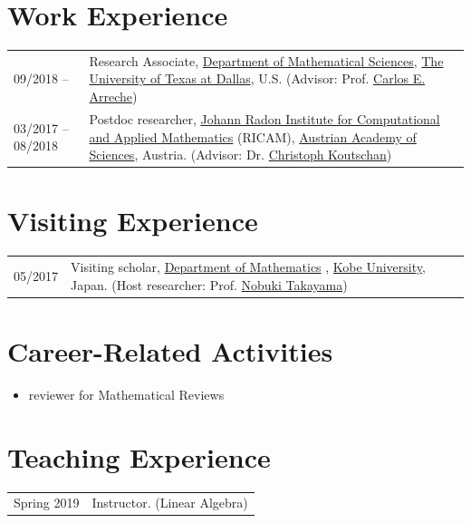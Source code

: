 \documentclass[a4paper,12pt]{article}
\begin{document}
\section*{\Large{Work Experience}}
\begin{tabular}{@{}p{1.4in}p{4in}}
09/2018 --            & Research Associate, \href{https://www.utdallas.edu/math/}{Department of Mathematical Sciences}, 
                        \href{https://www.utdallas.edu/}{The University of Texas at Dallas}, U.S. 
                        (Advisor: Prof. \href{https://www.utdallas.edu/~arreche/}{Carlos E. Arreche}) \\    
03/2017 -- 08/2018    & Postdoc researcher, 
                        \href{https://www.ricam.oeaw.ac.at/}{Johann Radon Institute for Computational and Applied Mathematics} (RICAM),
                        \href{http://www.oeaw.ac.at/en/austrian-academy-of-sciences/}{Austrian Academy of Sciences}, Austria. 
                        (Advisor: Dr. \href{http://www.koutschan.de/}{Christoph Koutschan})\\
\end{tabular}

\section*{\Large{Visiting Experience}}
\begin{tabular}{@{}p{0.8in}p{4.5in}}
05/2017               & Visiting scholar, 
                        \href{http://www.math.kobe-u.ac.jp/}{Department of Mathematics} ,
                        \href{http://www.kobe-u.ac.jp/en/}{Kobe University}, Japan. 
                        (Host researcher: Prof. \href{http://www.math.kobe-u.ac.jp/home-j/takayama-e.html}{Nobuki Takayama})\\
\end{tabular}

\section*{Career-Related Activities}
\begin{itemize}
 \item reviewer for Mathematical Reviews
\end{itemize}

\section*{Teaching Experience}
\begin{tabular}{@{}p{1.4in}p{4in}}
Spring 2019           & Instructor. (Linear Algebra) \\
\end{tabular}
\end{document}
